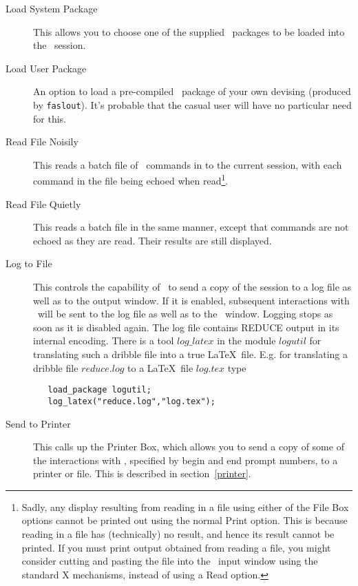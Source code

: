 \begin{description}

\item[Load System Package] This allows you to choose one of the
supplied \REDUCE\ packages to be loaded into the \REDUCE\ session.

\item[Load User Package] An option to load a pre-compiled \REDUCE\
package of your own devising (produced by {\tt faslout}).  It's
probable that the casual user will have no particular need for this.

\item[Read File Noisily] This reads a batch file of \REDUCE\ commands
in to the current session, with each command in the file being echoed
when read\footnote{Sadly, any display resulting from reading in a file
using either of the File Box options cannot be printed out using the
normal Print option.  This is because reading in a file has
(technically) no result, and hence its result cannot be printed.  If
you must print output obtained from reading a file, you might consider
cutting and pasting the file into the \xr\ input window using the
standard X mechanisms, instead of using a Read option.}.

\item[Read File Quietly] This reads a batch file in the same manner,
except that commands are not echoed as they are read.  Their results
are still displayed.

\item[Log to File] This controls the capability of \xr\ to send a copy
of the session to a log file as well as to the output window.  If it
is enabled, subsequent interactions with \REDUCE\ will be sent to the
log file as well as to the \xr\ window.  Logging stops as soon as it
is disabled again. The log file contains {\small REDUCE} output
in its internal encoding. There is a tool $log\_latex$
in the module $logutil$ for translating such a dribble file into a true
\LaTeX\ file. E.g. for translating a dribble file $reduce.log$ to
a \LaTeX\ file $log.tex$ type
\begin{verbatim}
   load_package logutil;
   log_latex("reduce.log","log.tex");
\end{verbatim}

\item[Send to Printer] This calls up the Printer Box, which allows you
to send a copy of some of the interactions with \REDUCE{}, specified
by begin and end prompt numbers, to a printer or file.  This is
described in section~\ref{printer}.

\end{description}

